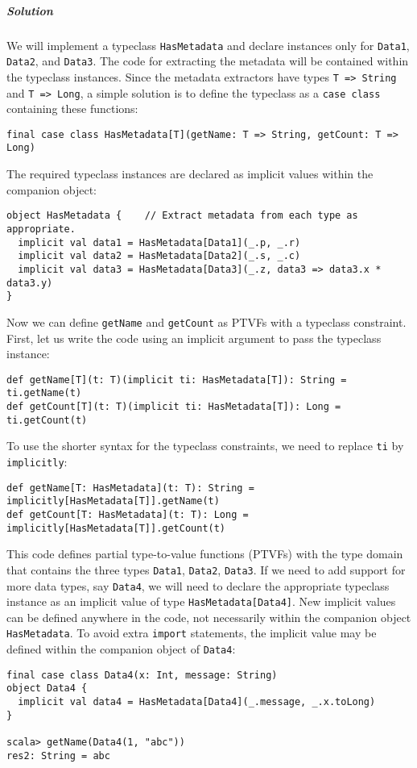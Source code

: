 \subparagraph{Solution}

We will implement a typeclass \lstinline!HasMetadata! and declare
instances only for \lstinline!Data1!, \lstinline!Data2!, and \lstinline!Data3!.
The code for extracting the metadata will be contained within the
typeclass instances. Since the metadata extractors have types \lstinline!T => String!
and \lstinline!T => Long!, a simple solution is to define the typeclass
as a \lstinline!case class! containing these functions:
\begin{lstlisting}
final case class HasMetadata[T](getName: T => String, getCount: T => Long)
\end{lstlisting}
The required typeclass instances are declared as implicit values within
the companion object:
\begin{lstlisting}
object HasMetadata {    // Extract metadata from each type as appropriate.
  implicit val data1 = HasMetadata[Data1](_.p, _.r)
  implicit val data2 = HasMetadata[Data2](_.s, _.c)
  implicit val data3 = HasMetadata[Data3](_.z, data3 => data3.x * data3.y)
}
\end{lstlisting}
Now we can define \lstinline!getName! and \lstinline!getCount! as
PTVFs with a typeclass constraint. First, let us write the code using
an implicit argument to pass the typeclass instance:
\begin{lstlisting}
def getName[T](t: T)(implicit ti: HasMetadata[T]): String = ti.getName(t)
def getCount[T](t: T)(implicit ti: HasMetadata[T]): Long = ti.getCount(t)
\end{lstlisting}
To use the shorter syntax for the typeclass constraints, we need to
replace \lstinline!ti! by \lstinline!implicitly!:
\begin{lstlisting}
def getName[T: HasMetadata](t: T): String = implicitly[HasMetadata[T]].getName(t)
def getCount[T: HasMetadata](t: T): Long = implicitly[HasMetadata[T]].getCount(t)
\end{lstlisting}

This code defines partial type-to-value functions (PTVFs) with the
type domain that contains the three types \lstinline!Data1!, \lstinline!Data2!,
\lstinline!Data3!. If we need to add support for more data types,
say \lstinline!Data4!, we will need to declare the appropriate typeclass
instance as an implicit value of type \lstinline!HasMetadata[Data4]!.
New implicit values can be defined anywhere in the code, not necessarily
within the companion object \lstinline!HasMetadata!. To avoid extra
\lstinline!import! statements, the implicit value may be defined
within the companion object of \lstinline!Data4!:
\begin{lstlisting}
final case class Data4(x: Int, message: String)
object Data4 {
  implicit val data4 = HasMetadata[Data4](_.message, _.x.toLong)
}

scala> getName(Data4(1, "abc"))
res2: String = abc
\end{lstlisting}

